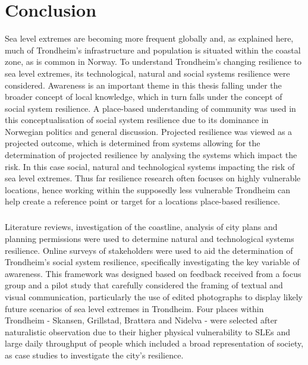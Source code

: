 


\chapter{Conclusion}

Sea level extremes are becoming more frequent globally and, as explained here, much of Trondheim's infrastructure and population is situated within the coastal zone, as is common in Norway. To understand Trondheim's changing resilience to sea level extremes, its technological, natural and social systems resilience were considered. Awareness is an important theme in this thesis falling under the broader concept of local knowledge, which in turn falls under the concept of social system resilience. A place-based understanding of community was used in this conceptualisation of social system resilience due to its dominance in Norwegian politics and general discussion. Projected resilience was viewed as a projected outcome, which is determined from systems allowing for the determination of projected resilience by analysing the systems which impact the risk. In this case social, natural and technological systems impacting the risk of sea level extremes. Thus far resilience research often focuses on highly vulnerable locations, hence working within the supposedly less vulnerable Trondheim can help create a reference point or target for a locations place-based resilience.
\paragraph{}

Literature reviews, investigation of the coastline, analysis of city plans and planning permissions were used to determine natural and technological systems resilience. Online surveys of stakeholders were used to aid the determination of Trondheim's social system resilience, specifically investigating the key variable of awareness. This framework was designed based on feedback received from a focus group and a pilot study that carefully considered the framing of textual and visual communication, particularly the use of edited photographs to display likely future scenarios of sea level extremes in Trondheim. Four places within Trondheim - Skansen, Grillstad, Brattøra and Nidelva - were selected after naturalistic observation due to their higher physical vulnerability to SLEs and large daily throughput of people which included a broad representation of society, as case studies to investigate the city's resilience.

